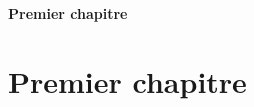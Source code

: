 \ifsolo
    ~

    \vspace{1cm}

    \begin{center}
        \textbf{\LARGE Premier chapitre} \\[1em]
    \end{center}
    \tableofcontents
\else
    \chapter{Premier chapitre}

    \minitoc
\fi
\thispagestyle{empty}

